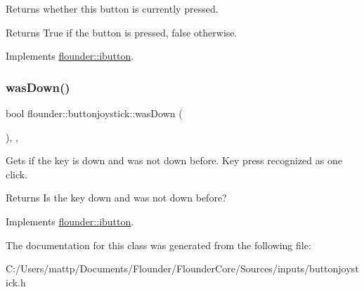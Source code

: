 Returns whether this button is currently pressed. 

\begin{DoxyReturn}{Returns}
True if the button is pressed, false otherwise. 
\end{DoxyReturn}


Implements \hyperlink{classflounder_1_1ibutton_ab64fd22a75ea66ce67fd9b1ad34fd837}{flounder\+::ibutton}.

\mbox{\label{classflounder_1_1buttonjoystick_a99302b1345fa773ec839290ae6c406e7}} 
\subsubsection{\texorpdfstring{was\+Down()}{wasDown()}}
{\footnotesize\ttfamily bool flounder\+::buttonjoystick\+::was\+Down (\begin{DoxyParamCaption}{ }\end{DoxyParamCaption})\hspace{0.3cm}{\ttfamily [inline]}, {\ttfamily [override]}, {\ttfamily [virtual]}}



Gets if the key is down and was not down before. Key press recognized as one click. 

\begin{DoxyReturn}{Returns}
Is the key down and was not down before? 
\end{DoxyReturn}


Implements \hyperlink{classflounder_1_1ibutton_a5fb7b3493c0ea0e67bb9defc272da0d3}{flounder\+::ibutton}.



The documentation for this class was generated from the following file\+:\begin{DoxyCompactItemize}
\item 
C\+:/\+Users/mattp/\+Documents/\+Flounder/\+Flounder\+Core/\+Sources/inputs/buttonjoystick.\+h\end{DoxyCompactItemize}
